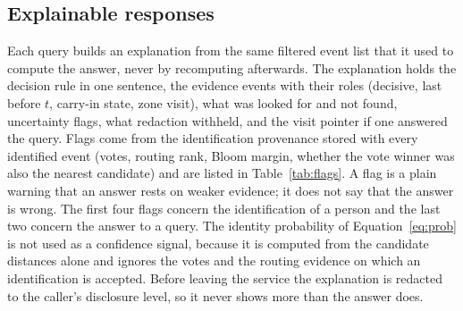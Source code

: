 \documentclass[12pt,a4paper,oneside]{report}
\begin{document}
\subsection{Explainable responses}
Each query builds an explanation from the same filtered event list that it used to compute the answer, never by recomputing afterwards. The explanation holds the decision rule in one sentence, the evidence events with their roles (decisive, last before $t$, carry-in state, zone visit), what was looked for and not found, uncertainty flags, what redaction withheld, and the visit pointer if one answered the query. Flags come from the identification provenance stored with every identified event (votes, routing rank, Bloom margin, whether the vote winner was also the nearest candidate) and are listed in Table~\ref{tab:flags}. A flag is a plain warning that an answer rests on weaker evidence; it does not say that the answer is wrong. The first four flags concern the identification of a person and the last two concern the answer to a query. The identity probability of Equation~\ref{eq:prob} is not used as a confidence signal, because it is computed from the candidate distances alone and ignores the votes and the routing evidence on which an identification is accepted. Before leaving the service the explanation is redacted to the caller's disclosure level, so it never shows more than the answer does.
\end{document}
